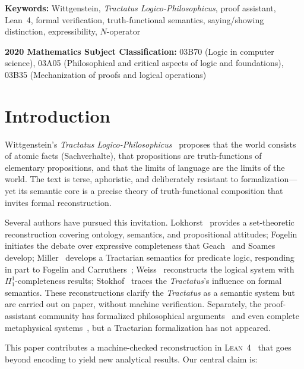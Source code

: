 \documentclass[10pt, letterpaper]{article}
\theoremstyle{definition}
\theoremstyle{remark}
\newcommand{\Lean}{\textsc{Lean}}
\begin{document}
\medskip
\noindent
\textbf{Keywords:} Wittgenstein, \emph{Tractatus Logico-Philosophicus},
proof assistant, Lean~4, formal verification, truth-functional
semantics, saying/showing distinction, expressibility,
$N$-operator

\medskip
\noindent
\textbf{2020 Mathematics Subject Classification:}
03B70 (Logic in computer science),
03A05 (Philosophical and critical aspects of logic and foundations),
03B35 (Mechanization of proofs and logical operations)

\section{Introduction}
\label{sec:intro}

Wittgenstein's \emph{Tractatus Logico-Philosophicus}~\cite{wittgenstein1921}
proposes that the world consists of atomic facts (Sachverhalte),
that propositions are truth-functions of elementary propositions,
and that the limits of language are the limits of the world.
The text is terse, aphoristic, and deliberately resistant to
formalization---yet its semantic core is a precise theory of
truth-functional composition that invites formal reconstruction.

Several authors have pursued this invitation.
Lokhorst~\cite{lokhorst1988} provides a set-theoretic
reconstruction covering ontology, semantics, and propositional
attitudes;
Fogelin~\cite{fogelin1987} initiates the debate over expressive
completeness that Geach~\cite{geach1981} and
Soames~\cite{soames1983} develop;
Miller~\cite{miller1995} develops a Tractarian semantics for
predicate logic, responding in part to Fogelin and
Carruthers~\cite{carruthers1989};
Weiss~\cite{weiss2017} reconstructs the logical system with
$\Pi^1_1$-completeness results;
Stokhof~\cite{stokhof2008} traces the \emph{Tractatus}'s
influence on formal semantics.
These reconstructions clarify the \emph{Tractatus} as a semantic
system but are carried out on paper, without machine verification.
Separately, the proof-assistant community has formalized
philosophical arguments~\cite{benzmuller2017,fitelson2007} and
even complete metaphysical systems~\cite{scherf2025}, but a
Tractarian formalization has not appeared.

This paper contributes a machine-checked reconstruction in
\Lean~4~\cite{moura2021} that goes beyond encoding to yield new
analytical results.  Our central claim is:
\end{document}
